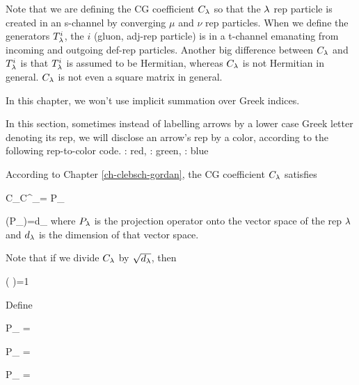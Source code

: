 Note that we are defining 
the CG coefficient $C_\lambda$ 
so that the $\lambda$
rep particle is created in an s-channel 
by converging $\mu$ and $\nu$ rep particles.
When we define the
generators $T^i_\lambda$, the $i$
(gluon, adj-rep particle) 
is in a t-channel
emanating from 
 incoming
and outgoing def-rep particles. 
Another big difference between 
$C_\lambda$  and
$T^i_\lambda$ is that $T^i_\lambda$ 
is assumed to be Hermitian,
whereas $C_\lambda$
is not Hermitian in general. $C_\lambda$ is not
even a square matrix in general.


In this chapter, we won't use implicit summation over Greek indices.


In this section, 
sometimes
instead of labelling arrows by a lower case Greek letter denoting its  rep, we will disclose an arrow's rep by a color,
according to the following 
rep-to-color code.
\beq
\lam: red,\quad
\mu: green,\quad
\nu: blue
\eeq

According to Chapter \ref{ch-clebsch-gordan},
the CG coefficient $C_\lambda$ satisfies

\beq
C_\lam C^\dagger_\lam = P_\lam
\eeq

\beq
\tr(P_\lam)=d_\lam
\eeq
where $P_\lambda$
is the projection operator onto
the vector space of the rep $\lambda$ and $d_\lambda$ is the dimension of that vector space.



Note that if we divide
$C_\lambda$ by $\sqrt{d_\lambda}$,
then

\beq
\tr\left(
{} 
{} 
\right)=1
\eeq

Define

\beq
{\color{red}P_\lam}
=
\bcen
{}
\ecen
\eeq

\beq
{\color{green}P_\mu}
=
\bcen
{}
\ecen
\eeq

\beq
{\color{blue}P_\nu}
=
\bcen
{}
\ecen
\eeq



